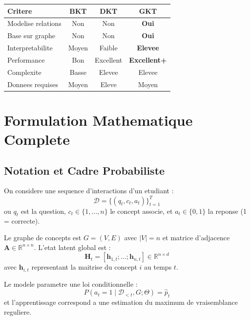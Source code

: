 \documentclass[11pt, a4paper]{article}
\begin{document}
\begin{center}
    \begin{tabular}{|l|c|c|c|}
        \hline
        \textbf{Critere}   & \textbf{BKT} & \textbf{DKT} & \textbf{GKT}        \\
        \hline
        Modelise relations & Non          & Non          & \textbf{Oui}        \\
        Base sur graphe    & Non          & Non          & \textbf{Oui}        \\
        Interpretabilite   & Moyen        & Faible       & \textbf{Elevee}     \\
        Performance        & Bon          & Excellent    & \textbf{Excellent+} \\
        Complexite         & Basse        & Elevee       & Elevee              \\
        Donnees requises   & Moyen        & Eleve        & Moyen               \\
        \hline
    \end{tabular}
\end{center}

\section{Formulation Mathematique Complete}

\subsection{Notation et Cadre Probabiliste}

On considere une sequence d'interactions d'un etudiant :
\begin{equation}
    \mathcal{D} = \{(q_t, c_t, a_t)\}_{t=1}^{T}
\end{equation}
ou $q_t$ est la question, $c_t \in \{1,\dots,n\}$ le concept associe, et $a_t \in \{0,1\}$ la reponse (1 = correcte).

Le graphe de concepts est $G=(V,E)$ avec $|V|=n$ et matrice d'adjacence $\mathbf{A} \in \mathbb{R}^{n \times n}$. L'etat latent global est :
\begin{equation}
    \mathbf{H}_t = [\mathbf{h}_{1,t};\dots;\mathbf{h}_{n,t}] \in \mathbb{R}^{n \times d}
\end{equation}
avec $\mathbf{h}_{i,t}$ representant la maitrise du concept $i$ au temps $t$.

Le modele parametre une loi conditionnelle :
\begin{equation}
    P(a_t=1 \mid \mathcal{D}_{<t}, G; \Theta) = \hat{p}_t
\end{equation}
et l'apprentissage correspond a une estimation du maximum de vraisemblance reguliere.
\end{document}
